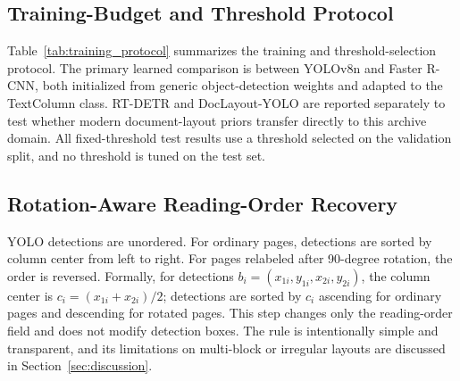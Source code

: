 \documentclass[12pt]{article}
\begin{document}
\subsection{Training-Budget and Threshold Protocol}
Table~\ref{tab:training_protocol} summarizes the training and threshold-selection protocol. The primary learned comparison is between YOLOv8n and Faster R-CNN, both initialized from generic object-detection weights and adapted to the TextColumn class. RT-DETR and DocLayout-YOLO are reported separately to test whether modern document-layout priors transfer directly to this archive domain. All fixed-threshold test results use a threshold selected on the validation split, and no threshold is tuned on the test set.

\begin{table}[t]
\centering
\caption{Training-budget and threshold-selection protocol. Transfer baselines are diagnostic rather than fully optimized comparisons because their architectures and pretraining domains differ substantially.}
\label{tab:training_protocol}
\end{table}

\subsection{Rotation-Aware Reading-Order Recovery}
YOLO detections are unordered. For ordinary pages, detections are sorted by column center from left to right. For pages relabeled after 90-degree rotation, the order is reversed. Formally, for detections $b_i=(x_{1i},y_{1i},x_{2i},y_{2i})$, the column center is $c_i=(x_{1i}+x_{2i})/2$; detections are sorted by $c_i$ ascending for ordinary pages and descending for rotated pages. This step changes only the reading-order field and does not modify detection boxes. The rule is intentionally simple and transparent, and its limitations on multi-block or irregular layouts are discussed in Section~\ref{sec:discussion}.
\end{document}
